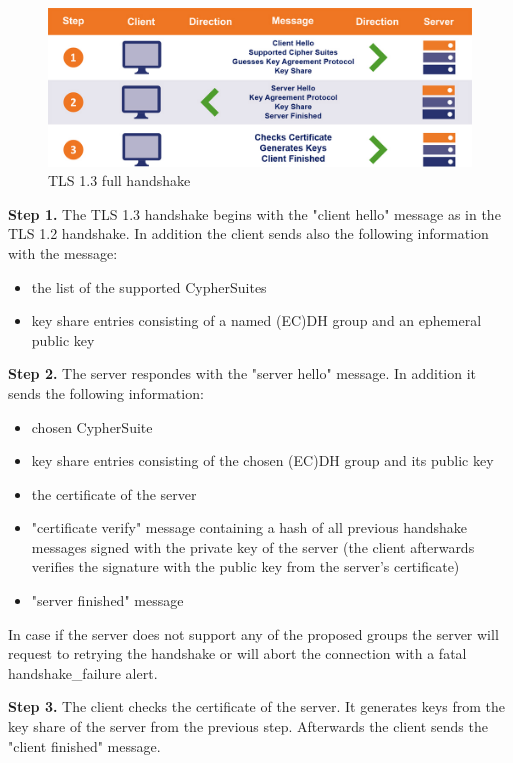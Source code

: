 \begin{figure}[H]
	\centering
		\includegraphics[scale=0.35]{images/handshake1_3.jpg}
	\caption{TLS 1.3 full handshake \cite{sslstore:handshake}}
	\label{fig:handshake1_3}
\end{figure}

\textbf{Step 1.} The TLS 1.3 handshake begins with the "client hello" message as in the TLS 1.2 handshake. In addition the client sends also the following information with the message:

\begin{itemize}
	\item the list of the supported CypherSuites
	\item key share entries consisting of a named (EC)DH group and an ephemeral public key
\end{itemize}

\textbf{Step 2.} The server respondes with the "server hello" message. In addition it sends the following information:

\begin{itemize}
	\item chosen CypherSuite
	\item key share entries consisting of the chosen (EC)DH group and its public key
	\item the certificate of the server
	\item "certificate verify" message containing a hash of all previous handshake messages signed with the private key of the server (the client afterwards verifies the signature with the public key from the server's certificate)
	\item "server finished" message
\end{itemize}

In case if the server does not support any of the proposed groups the server will request to retrying the handshake or will abort the connection with a fatal handshake\_failure alert.

\textbf{Step 3.} The client checks the certificate of the server. It generates keys from the key share of the server from the previous step. Afterwards the client sends the "client finished" message. \cite{Hassenstein}\cite{sslstore:handshake}

